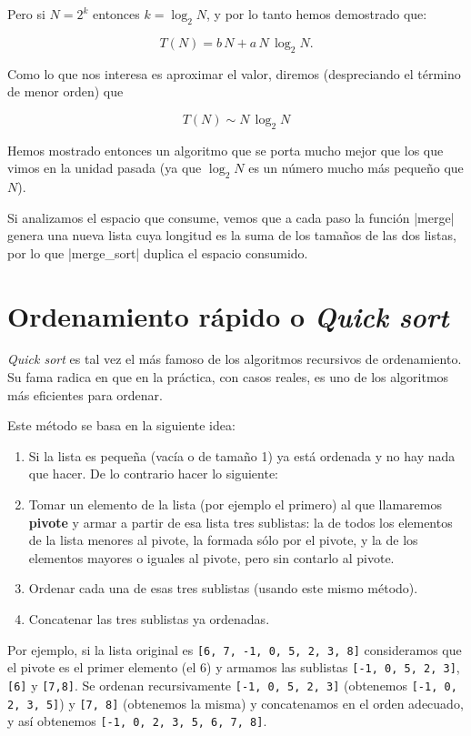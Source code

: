 Pero si $N = 2^k$ entonces $k=\log_2N$, y por lo tanto hemos demostrado
que:

\begin{equation}
T(N) = b \, N + a \, N \, \log_2 N.
\end{equation}

Como lo que nos interesa es aproximar el valor, diremos (despreciando el
término de menor orden) que

$$ T(N) \sim N \, \log_2 N $$

Hemos mostrado entonces
un algoritmo que se porta mucho mejor que los que vimos en la unidad
pasada (ya que $\log_2 N$ es un número mucho más pequeño que $N$).

Si analizamos el espacio que consume, vemos que a cada paso la función |merge|
genera una nueva lista cuya longitud es la suma de los tamaños de las dos
listas, por lo que |merge_sort| duplica el espacio consumido.

\section{Ordenamiento rápido o \emph{Quick sort}}

\emph{Quick sort} es tal vez el más famoso de los algoritmos recursivos de ordenamiento.
Su fama radica en que en la práctica, con casos reales, es uno de los
algoritmos más eficientes para ordenar.

Este método se basa en la siguiente idea:

\begin{enumerate}
\item Si la lista es pequeña (vacía o de tamaño 1) ya está ordenada y
no hay nada que hacer. De lo contrario hacer lo siguiente:

\item Tomar un elemento de la lista (por ejemplo el primero) al que
llamaremos {\bf pivote} y armar a partir de esa lista tres sublistas: la de
todos los elementos de la lista menores al pivote, la formada sólo por el
pivote, y la de los elementos mayores o iguales al pivote, pero sin
contarlo al pivote.

\item Ordenar cada una de esas tres sublistas (usando este mismo método).

\item Concatenar las tres sublistas ya ordenadas.
\end{enumerate}

Por ejemplo, si la lista original es \lstinline+[6, 7, -1, 0, 5, 2, 3, 8]+
consideramos que el pivote es el primer elemento (el 6) y armamos las
sublistas \lstinline+[-1, 0, 5, 2, 3]+, \lstinline+[6]+ y
\lstinline+[7,8]+. Se ordenan recursivamente \lstinline+[-1, 0, 5, 2, 3]+
(obtenemos \lstinline+[-1, 0, 2, 3, 5]+) y \lstinline+[7, 8]+ (obtenemos la
misma) y concatenamos en el orden adecuado, y así obtenemos
\lstinline+[-1, 0, 2, 3, 5, 6, 7, 8]+.

